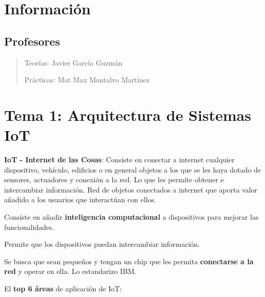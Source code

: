 \documentclass[12pt, twoside, openright]{report} %
\begin{document}
\listoffigures
\thispagestyle{fancy}

\listoftables
\thispagestyle{fancy}





\chapter{Información}
\section{Profesores}

\begin{quote}
	Teorías: Javier García Guzmán

	Prácticas: Mat Max Montalvo Martínez
\end{quote}

\chapter{Tema 1: Arquitectura de Sistemas
  IoT}


\textbf{IoT - Internet de las Cosas}: Consiste en conectar a internet
cualquier dispositivo, vehículo, edificios o en general objetos a los
que se les haya dotado de sensores, actuadores y conexión a la red. Lo
que les permite obtener e intercambiar información. Red de objetos
conectados a internet que aporta valor añadido a los usuarios que
interactúan con ellos.

Consiste en añadir \textbf{inteligencia computacional} a dispositivos
para mejorar las funcionalidades.

Permite que los dispositivos puedan intercambiar información.

Se busca que sean pequeños y tengan un chip que les permita
\textbf{conectarse a la red} y operar en ella. Lo estandarizo IBM.

El \textbf{top 6 áreas} de aplicación de IoT:
\end{document}
